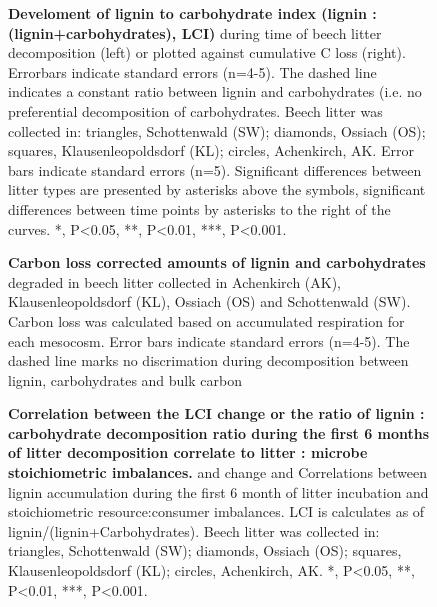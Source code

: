 \documentclass[10pt]{article}
\begin{document}
\begin{flushleft}
\begin{figure}[!h]
\begin{center}
\end{center}
\caption{
{\bf Develoment of lignin to carbohydrate index (lignin : (lignin+carbohydrates), LCI)} during time of beech litter decomposition (left) or plotted against cumulative C loss (right). Errorbars indicate standard errors (n=4-5). The dashed line indicates a constant ratio between lignin and carbohydrates (i.e. no preferential decomposition of carbohydrates. Beech litter was collected in: triangles, Schottenwald (SW); diamonds, Ossiach (OS); squares, Klausenleopoldsdorf (KL); circles, Achenkirch, AK. Error bars indicate standard errors (n=5). Significant differences between litter types are presented by asterisks above the symbols, significant differences between time points by asterisks to the right of the curves. *, P\textless 0.05, **, P\textless 0.01, ***, P\textless 0.001.}
\label{fig:lci}
\end{figure}

\begin{figure}[h!]
\vspace*{2mm}
\begin{center}
\end{center}
\caption{
{\bf Carbon loss corrected amounts of lignin and carbohydrates} degraded in beech litter collected in Achenkirch (AK), Klausenleopoldsdorf (KL), Ossiach (OS) and Schottenwald (SW). Carbon loss was calculated based on accumulated respiration for each mesocosm. Error bars indicate standard errors (n=4-5). The dashed line marks no discrimation during decomposition between lignin, carbohydrates and bulk carbon}
\label{fig:degr}
\end{figure}

\begin{figure}[h!]
\vspace*{2mm}
\begin{center}
\end{center}
\caption{
{\bf Correlation between the LCI change or the ratio of lignin : carbohydrate decomposition ratio during the first 6 months of litter decomposition correlate to litter : microbe stoichiometric imbalances.} and change and Correlations between lignin accumulation during the first 6 month of litter incubation and stoichiometric resource:consumer imbalances. LCI is calculates as of lignin/(lignin+Carbohydrates).  Beech litter was collected in: triangles, Schottenwald (SW); diamonds, Ossiach (OS); squares, Klausenleopoldsdorf (KL); circles, Achenkirch, AK. *, P\textless 0.05, **, P\textless 0.01, ***, P\textless 0.001.}
\label{fig:cor1}
\end{figure}


\end{flushleft}
\end{document}
